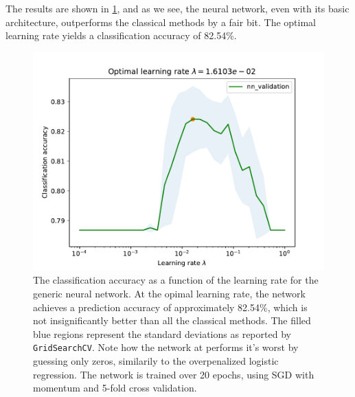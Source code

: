 \documentclass[a4paper, oneside, article]{memoir}
\begin{document}
	The results are shown in \cref{fig:credit_card_nn}, and as we see, the
	neural network, even with its basic architecture, outperforms the
	classical methods by a fair bit. The optimal learning rate yields a
	classification accuracy of 82.54\%.
	
	\begin{figure}[htpb]
		\centering
		\includegraphics[width=0.8\linewidth]{imgs/classification_credit_cards_nn.pdf}
		\caption{The classification accuracy as a function of the
			learning rate for the generic neural network. At the
			opimal learning rate, the network achieves a prediction
			accuracy of approximately 82.54\%, which is not
			insignificantly better than all the classical methods.
			The filled blue regions represent the standard
			deviations as reported by \texttt{GridSearchCV}. Note
			how the network at performs it's worst by guessing only
			zeros, similarily to the overpenalized logistic
		regression. The network is trained over 20 epochs, using SGD
	with momentum and 5-fold cross validation. }%
		\label{fig:credit_card_nn}
	\end{figure}
\appendix
\end{document}
